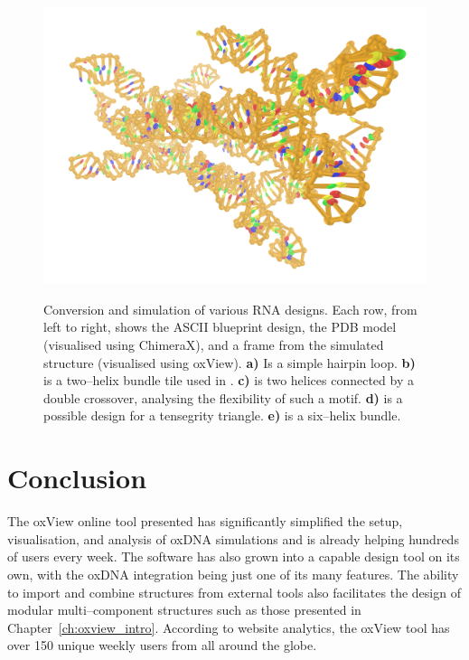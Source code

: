 \begin{figure}[ht]
\begin{center}
{  \centering\includegraphics[align=c,width=\textwidth/3]{figures/oxrna_sims/6HB-5KL_last_conf.png}
}
\end{center}
\caption{Conversion and simulation of various RNA designs. Each row, from left to right, shows the ASCII blueprint design, the PDB model (visualised using ChimeraX), and a frame from the simulated structure (visualised using oxView).  \textbf{a)} Is a simple hairpin loop.  \textbf{b)} is a two--helix bundle tile used in \cite{geary2014single}.  \textbf{c)} is two helices connected by a double crossover, analysing the flexibility of such a motif.  \textbf{d)} is a possible design for a tensegrity triangle. \textbf{e)} is a six--helix bundle.}
\label{fig:oxRNA_sims}\end{figure}



\section{Conclusion}
The oxView online tool presented has significantly simplified the setup, visualisation, and analysis of oxDNA simulations and is already helping hundreds of users every week. The software has also grown into a capable design tool on its own, with the oxDNA integration being just one of its many features. The ability to import and combine structures from external tools also facilitates the design of modular multi--component structures such as those presented in Chapter~\ref{ch:oxview_intro}.
According to website analytics, the oxView tool has over 150 unique weekly users from all around the globe.
